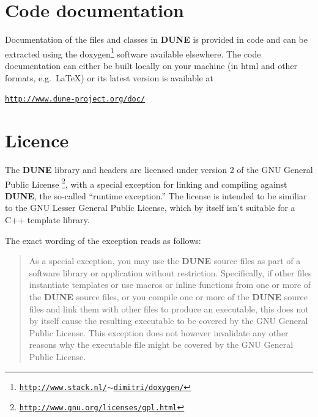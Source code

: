 \documentclass[11pt,a4paper,headinclude,footinclude,DIV16,normalheadings]{scrreprt}
\newcommand{\Dune}{{\sf\bfseries DUNE}\xspace}
\begin{document}
\section{Code documentation}

Documentation of the files and classes in \Dune{} is provided in code and
can be extracted using the
doxygen\footnote{\href{http://www.stack.nl/~dimitri/doxygen/}{\texttt{http://www.stack.nl/$\sim$dimitri/doxygen/}}}
software available elsewhere. The code documentation can either be built
locally on your machine (in html and other formats, e.g.~\LaTeX) 
or its latest version is available at
\begin{center}
\href{http://www.dune-project.org/doc/}%
{\texttt{http://www.dune-project.org/doc/}}
\end{center}


\section{Licence}

The \Dune{} library and headers are licensed under version 2 of the
GNU General Public License%
\footnote{\href{http://www.gnu.org/licenses/gpl.html}%
  {\texttt{http://www.gnu.org/licenses/gpl.html}}}, with a special
exception for linking and compiling against \Dune{}, the so-called
``runtime exception.''  The license is intended to be similiar to the
GNU Lesser General Public License, which by itself isn't suitable for
a C++ template library.

The exact wording of the exception reads as follows:

\begin{quote}  
   As a special exception, you may use the \Dune{} source files as part
   of a software library or application without restriction.
   Specifically, if other files instantiate templates or use macros or
   inline functions from one or more of the \Dune{} source files, or you
   compile one or more of the \Dune{} source files and link them with
   other files to produce an executable, this does not by itself cause
   the resulting executable to be covered by the GNU General Public
   License.  This exception does not however invalidate any other
   reasons why the executable file might be covered by the GNU General
   Public License.
\end{quote}
\end{document}
